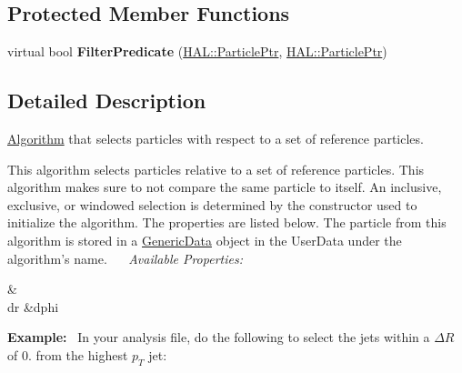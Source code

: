 \subsection*{Protected Member Functions}
\begin{DoxyCompactItemize}
\item 
\hypertarget{class_h_a_l_1_1_algorithms_1_1_select_ref_particle_a04fa4b96a01e34c5ee0bb8782eb51b00}{virtual bool {\bfseries Filter\+Predicate} (\hyperlink{class_h_a_l_1_1_generic_particle}{H\+A\+L\+::\+Particle\+Ptr}, \hyperlink{class_h_a_l_1_1_generic_particle}{H\+A\+L\+::\+Particle\+Ptr})}\label{class_h_a_l_1_1_algorithms_1_1_select_ref_particle_a04fa4b96a01e34c5ee0bb8782eb51b00}

\end{DoxyCompactItemize}


\subsection{Detailed Description}
\hyperlink{class_h_a_l_1_1_algorithm}{Algorithm} that selects particles with respect to a set of reference particles. 

This algorithm selects particles relative to a set of reference particles. This algorithm makes sure to not compare the same particle to itself. An inclusive, exclusive, or windowed selection is determined by the constructor used to initialize the algorithm. The properties are listed below. The particle from this algorithm is stored in a \hyperlink{class_h_a_l_1_1_generic_data}{Generic\+Data} object in the User\+Data under the algorithm's name.~\newline
~\newline
{\itshape Available Properties\+:} \begin{TabularC}{2}
\hline
{}\PBS{}&\PBS\centering {\bf $ \Delta\phi $  }\\
\PBS\centering dr &\PBS\centering dphi \\
\end{TabularC}
{\bfseries Example\+:}~\newline
In your analysis file, do the following to select the jets within a $ \Delta R $ of 0. from the highest $ p_T $ jet\+:


